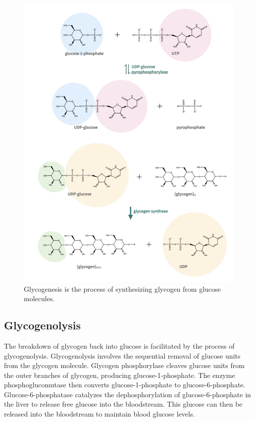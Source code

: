 \documentclass[]{tufte-handout}
\begin{document}
\begin{figure}

{\centering \includegraphics{img/glyogenesis} 

}

\caption[Glycogenesis is the process of synthesizing glycogen from glucose molecules]{Glycogenesis is the process of synthesizing glycogen from glucose molecules.}\label{fig:unnamed-chunk-3}
\end{figure}

\subsection{Glycogenolysis}\label{glycogenolysis}

The breakdown of glycogen back into glucose is facilitated by the process of glycogenolysis. Glycogenolysis involves the sequential removal of glucose units from the glycogen molecule. Glycogen phosphorylase cleaves glucose units from the outer branches of glycogen, producing glucose-1-phosphate. The enzyme phosphoglucomutase then converts glucose-1-phosphate to glucose-6-phosphate. Glucose-6-phosphatase catalyzes the dephosphorylation of glucose-6-phosphate in the liver to release free glucose into the bloodstream. This glucose can then be released into the bloodstream to maintain blood glucose levels.
\end{document}
